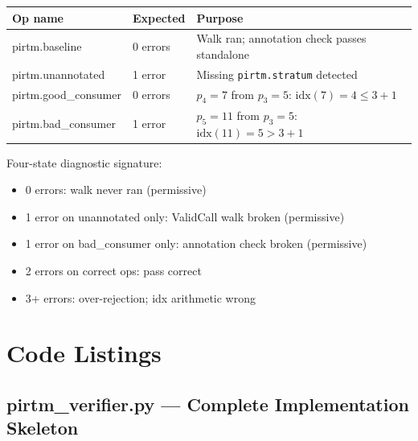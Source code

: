 \documentclass[11pt,letterpaper]{article}
\theoremstyle{pirtmthm}
\theoremstyle{remark}
\begin{document}
\begin{center}
\renewcommand{\arraystretch}{1.3}
\begin{tabular}{@{}>{\ttfamily\small}p{3.6cm}p{1.8cm}p{5.8cm}@{}}
  \toprule
  \textrm{Op name} & Expected & Purpose \\
  \midrule
  pirtm.baseline       & 0 errors & Walk ran; annotation check passes standalone \\
  pirtm.unannotated    & 1 error  & Missing \texttt{pirtm.stratum} detected \\
  pirtm.good\_consumer & 0 errors & $p_4=7$ from $p_3=5$: $\mathrm{idx}(7)=4\leq3+1$ \\
  pirtm.bad\_consumer  & 1 error  & $p_5=11$ from $p_3=5$: $\mathrm{idx}(11)=5>3+1$ \\
  \bottomrule
\end{tabular}
\end{center}

Four-state diagnostic signature:
\begin{itemize}[leftmargin=1.8em]
  \item 0 errors: walk never ran (permissive)
  \item 1 error on unannotated only: ValidCall walk broken (permissive)
  \item 1 error on bad\_consumer only: annotation check broken (permissive)
  \item 2 errors on correct ops: pass correct
  \item 3+ errors: over-rejection; idx arithmetic wrong
\end{itemize}

\section{Code Listings}

\subsection{pirtm\_verifier.py --- Complete Implementation Skeleton}
\end{document}
